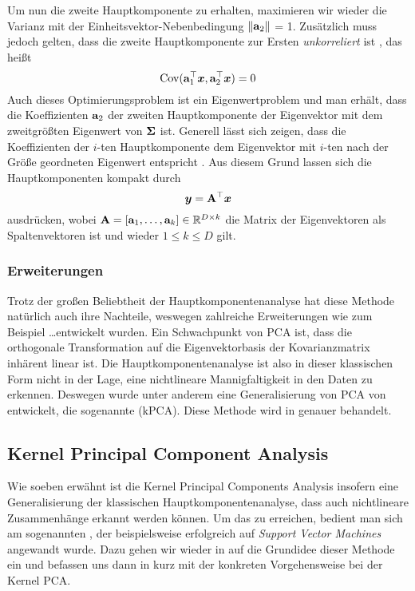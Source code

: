 Um nun die zweite Hauptkomponente zu erhalten, maximieren wir wieder die Varianz mit der Einheitsvektor-Nebenbedingung $\left\lVert\mathbf{a}_2\right\rVert$ = 1. Zusätzlich muss jedoch gelten, dass die zweite Hauptkomponente zur Ersten \textit{unkorreliert} ist \parencite[5]{Jolliffe.2002}, das heißt
\begin{equation}
	\operatorname{Cov}(\mathbf{a}_1^\top\bm{x}, \mathbf{a}_2^\top\bm{x}) = 0
\end{equation}
Auch dieses Optimierungsproblem ist ein Eigenwertproblem und man erhält, dass die Koeffizienten $\mathbf{a}_2$ der zweiten Hauptkomponente der Eigenvektor mit dem zweitgrößten Eigenwert von $\mathbf{\Sigma}$ ist.
Generell lässt sich zeigen, dass die Koeffizienten der $i$-ten Hauptkomponente dem Eigenvektor mit $i$-ten nach der Größe geordneten Eigenwert entspricht \parencite[6]{Jolliffe.2002}. Aus diesem Grund lassen sich die Hauptkomponenten kompakt durch
\begin{equation}
	\bm{y} = \mathbf{A}^\top \bm{x}
\end{equation}
ausdrücken, wobei $\mathbf{A} = [\mathbf{a}_1,\ldots,\mathbf{a}_k] \in \mathbb{R}^{D \times k}$ die Matrix der Eigenvektoren als Spaltenvektoren ist und wieder $1 \leq k \leq D$ gilt.

\subsubsection{Erweiterungen}
\label{ch:MethodenDerDimRed:traditionell:PCA:Erweiterungen}
Trotz der großen Beliebtheit der Hauptkomponentenanalyse hat diese Methode natürlich auch ihre Nachteile, weswegen zahlreiche Erweiterungen wie zum Beispiel \ldots\addref entwickelt wurden.
Ein Schwachpunkt von PCA ist, dass die orthogonale Transformation auf die Eigenvektorbasis der Kovarianzmatrix inhärent linear ist. Die Hauptkomponentenanalyse ist also in dieser klassischen Form nicht in der Lage, eine nichtlineare Mannigfaltigkeit in den Daten zu erkennen. Deswegen wurde unter anderem eine Generalisierung von PCA von \textcite{Scholkopf.1997} entwickelt, die sogenannte  (kPCA). Diese Methode wird in  genauer behandelt.


\subsection{Kernel Principal Component Analysis}
\label{ch:MethodenDerDimRed:traditionell:kPCA}
Wie soeben erwähnt ist die Kernel Principal Components Analysis insofern eine Generalisierung der klassischen Hauptkomponentenanalyse, dass auch nichtlineare Zusammenhänge erkannt werden können.
Um das zu erreichen, bedient man sich am sogenannten , der beispielsweise erfolgreich auf \textit{Support Vector Machines} \parencite{Boser.1992} angewandt wurde.
Dazu gehen wir wieder in  auf die Grundidee dieser Methode ein und befassen uns dann in  kurz mit der konkreten Vorgehensweise bei der Kernel PCA.


